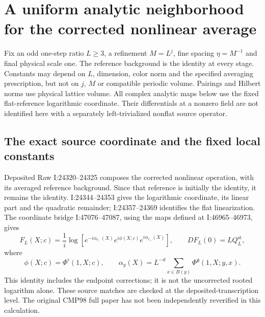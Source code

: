 
\section{A uniform analytic neighborhood for the corrected nonlinear average}
\label{na-section}

Fix an odd one-step ratio $L\ge3$, a refinement $M=L^j$, fine
spacing $\eta=M^{-1}$ and final physical scale one. The reference
background is the identity at every stage. Constants may depend on
$L$, dimension, color norm and the specified averaging prescription,
but not on $j$, $M$ or compatible periodic volume. Pairings and
Hilbert norms use physical lattice volume. All complex analytic maps
below use the fixed flat-reference logarithmic coordinate. Their
differentials at a nonzero field are not identified here with a
separately left-trivialized nonflat source operator.

\subsection{The exact source coordinate and the fixed local constants}
\label{na-source}

Deposited Raw I:24320--24325 composes the corrected nonlinear
operation, with its averaged reference background. Since that
reference is initially the identity, it remains the identity.
I:24344--24353 gives the logarithmic coordinate, its linear part and
the quadratic remainder; I:24357--24369 identifies the flat
linearization. The coordinate bridge I:47076--47087, using the maps
defined at I:46965--46973, gives
\begin{equation}
 F_L(X;c)=\frac1i\log\left[
  e^{-i\alpha_{c_-}(X)}e^{i\phi(X;c)}e^{i\alpha_{c_+}(X)}\right],
 \qquad DF_L(0)=LQ_L^{\mathrm{st}},
 \label{na-coordinate}
\end{equation}
where
\[
 \phi(X;c)=\Phi^{\flat}(1,X;c),\qquad
 \alpha_y(X)=L^{-d}\sum_{x\in B(y)}\Phi^{\mathfrak g}(1,X;y,x).
\]
This identity includes the endpoint corrections; it is not the
uncorrected rooted logarithm alone. These source matches are checked
at the deposited-transcription level. The original CMP98 full paper
has not been independently reverified in this calculation.

